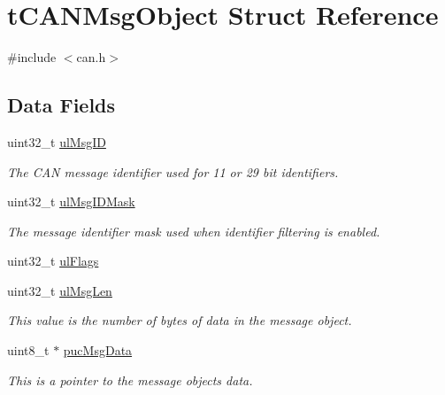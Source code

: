 \hypertarget{structtCANMsgObject}{}\section{t\+C\+A\+N\+Msg\+Object Struct Reference}
\label{structtCANMsgObject}


{\ttfamily \#include $<$can.\+h$>$}

\subsection*{Data Fields}
\begin{DoxyCompactItemize}
\item 
uint32\+\_\+t \hyperlink{structtCANMsgObject_a663d0cdd6893cd3ee998795dd0620dfd}{ul\+Msg\+ID}\hypertarget{structtCANMsgObject_a663d0cdd6893cd3ee998795dd0620dfd}{}\label{structtCANMsgObject_a663d0cdd6893cd3ee998795dd0620dfd}

\begin{DoxyCompactList}\small\item\em The C\+AN message identifier used for 11 or 29 bit identifiers. \end{DoxyCompactList}\item 
uint32\+\_\+t \hyperlink{structtCANMsgObject_a99a0c309158bfe53401884a66711e80c}{ul\+Msg\+I\+D\+Mask}\hypertarget{structtCANMsgObject_a99a0c309158bfe53401884a66711e80c}{}\label{structtCANMsgObject_a99a0c309158bfe53401884a66711e80c}

\begin{DoxyCompactList}\small\item\em The message identifier mask used when identifier filtering is enabled. \end{DoxyCompactList}\item 
uint32\+\_\+t \hyperlink{structtCANMsgObject_a23801a4be509591978e7b4f9bcafe124}{ul\+Flags}
\item 
uint32\+\_\+t \hyperlink{structtCANMsgObject_a5364beed437bfdfa7c536ab5b3417ea9}{ul\+Msg\+Len}\hypertarget{structtCANMsgObject_a5364beed437bfdfa7c536ab5b3417ea9}{}\label{structtCANMsgObject_a5364beed437bfdfa7c536ab5b3417ea9}

\begin{DoxyCompactList}\small\item\em This value is the number of bytes of data in the message object. \end{DoxyCompactList}\item 
uint8\+\_\+t $\ast$ \hyperlink{structtCANMsgObject_a2f2a9f1ed9b01b6a2caf2256ec938a1b}{puc\+Msg\+Data}\hypertarget{structtCANMsgObject_a2f2a9f1ed9b01b6a2caf2256ec938a1b}{}\label{structtCANMsgObject_a2f2a9f1ed9b01b6a2caf2256ec938a1b}

\begin{DoxyCompactList}\small\item\em This is a pointer to the message object\textquotesingle{}s data. \end{DoxyCompactList}\end{DoxyCompactItemize}


